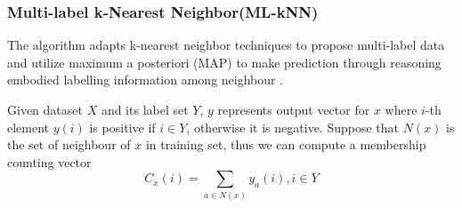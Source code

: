 \subsubsection{Multi-label k-Nearest Neighbor(ML-kNN)}

The algorithm adapts k-nearest neighbor techniques to propose multi-label data and utilize maximum a posteriori (MAP) to make prediction through reasoning embodied labelling information among neighbour \citep{zhang2007ml}.

Given dataset $X$ and its label set $Y$, $y$ represents output vector for $x$ where $i$-th element $y(i)$ is positive if $i \in Y$, otherwise it is negative. Suppose that $N(x)$ is the set of neighbour of $x$ in training set, thus we can compute a membership counting vector
\begin{equation}\label{eq:KNNCounting}
C_{x}(i) = \sum_{a \in N(x)} y_{a}(i), i \in Y
\end{equation}

